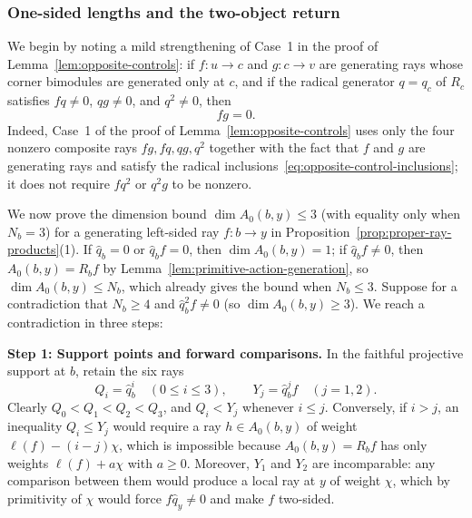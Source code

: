 \subsubsection{One-sided lengths and the two-object return}

We begin by noting a mild strengthening of Case~1 in the proof of Lemma~\ref{lem:opposite-controls}: if $f\colon u\to c$ and $g\colon c\to v$ are generating rays whose corner bimodules are generated only at $c$, and if the radical generator $q=q_c$ of $R_c$ satisfies $fq\ne0$, $qg\ne0$, and $q^2\ne0$, then
\begin{equation}
  fg=0.
  \label{eq:strong-star-vanishing}
\end{equation}
Indeed, Case~1 of the proof of Lemma~\ref{lem:opposite-controls} uses only the four nonzero composite rays $fg,fq,qg,q^2$ together with the fact that $f$ and $g$ are generating rays and satisfy the radical inclusions~\eqref{eq:opposite-control-inclusions}; it does not require $fq^2$ or $q^2g$ to be nonzero.

We now prove the dimension bound $\dim A_0(b,y)\leq3$ (with equality only when $N_b=3$) for a generating left-sided ray $f\colon b\to y$ in Proposition~\ref{prop:proper-ray-products}(1). If $\widehat q_b=0$ or $\widehat q_bf=0$, then $\dim A_0(b,y)=1$; if $\widehat q_bf\ne0$, then $A_0(b,y)=R_bf$ by Lemma~\ref{lem:primitive-action-generation}, so $\dim A_0(b,y)\leq N_b$, which already gives the bound when $N_b\leq3$. Suppose for a contradiction that $N_b\geq4$ and $\widehat q_b^2f\ne0$ (so $\dim A_0(b,y)\geq3$). We reach a contradiction in three steps:

\medskip
\noindent\textbf{Step 1: Support points and forward comparisons.}
In the faithful projective support at $b$, retain the six rays
\[
  Q_i=\widehat q_b^i\quad(0\leq i\leq3),\qquad
  Y_j=\widehat q_b^jf\quad(j=1,2).
\]
Clearly $Q_0<Q_1<Q_2<Q_3$, and $Q_i<Y_j$ whenever $i\leq j$. Conversely, if $i>j$, an inequality $Q_i\leq Y_j$ would require a ray $h\in A_0(b,y)$ of weight $\ell(f)-(i-j)\chi$, which is impossible because $A_0(b,y)=R_bf$ has only weights $\ell(f)+a\chi$ with $a\geq0$. Moreover, $Y_1$ and $Y_2$ are incomparable: any comparison between them would produce a local ray at $y$ of weight $\chi$, which by primitivity of $\chi$ would force $f\widehat q_y\ne0$ and make $f$ two-sided.

